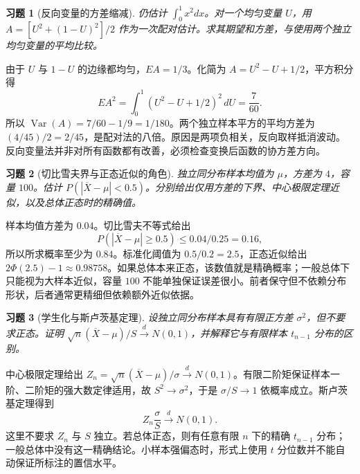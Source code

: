 \documentclass[UTF8,12pt,a4paper,fontset=fandol]{ctexart}
\newtheorem{exercise}{习题}[section]
\begin{document}
\begin{exercise}[反向变量的方差缩减]\label{q:B17.18}
仍估计 $\int_0^1x^2dx$。对一个均匀变量 $U$，用 $A=[U^2+(1-U)^2]/2$ 作为一次配对估计。求其期望和方差，与使用两个独立均匀变量的平均比较。\par{}
\end{exercise}

\begin{solve}\label{a:B17.18}由于 $U$ 与 $1-U$ 的边缘都均匀，$EA=1/3$。化简为 $A=U^2-U+1/2$，平方积分得\[EA^2=\int_0^1(U^2-U+1/2)^2\,dU=\frac7{60}.\]所以 $\operatorname{Var}(A)=7/60-1/9=1/180$。两个独立样本平方的平均方差为 $(4/45)/2=2/45$，是配对法的八倍。原因是两项负相关，反向取样抵消波动。反向变量法并非对所有函数都有改善，必须检查变换后函数的协方差方向。\end{solve}

\begin{exercise}[切比雪夫界与正态近似的角色]\label{q:B17.19}
独立同分布样本均值为 $\mu$，方差为 $4$，容量 $100$。估计 $P(|\overline X-\mu|<0.5)$。分别给出仅用方差的下界、中心极限定理近似，以及总体正态时的精确值。\par{}
\end{exercise}

\begin{solve}\label{a:B17.19}样本均值方差为 $0.04$。切比雪夫不等式给出\[P(|\overline X-\mu|\ge0.5)\le0.04/0.25=0.16,\]所以所求概率至少为 $0.84$。标准化阈值为 $0.5/0.2=2.5$，正态近似给出 $2\Phi(2.5)-1\approx0.98758$。如果总体本来正态，该数值就是精确概率；一般总体下只能视为大样本近似，容量 $100$ 不能单独保证误差很小。前者保守但不依赖分布形状，后者通常更精细但依赖额外近似依据。\end{solve}

\begin{exercise}[学生化与斯卢茨基定理]\label{q:B17.20}
设独立同分布样本具有有限正方差 $\sigma^2$，但不要求正态。证明 $\sqrt n(\overline X-\mu)/S\xrightarrow dN(0,1)$，并解释它与有限样本 $t_{n-1}$ 分布的区别。\par{}
\end{exercise}

\begin{solve}\label{a:B17.20}中心极限定理给出 $Z_n=\sqrt n(\overline X-\mu)/\sigma\xrightarrow dN(0,1)$。有限二阶矩保证样本一阶、二阶矩的强大数定律适用，故 $S^2\to\sigma^2$，于是 $\sigma/S\to1$ 依概率成立。斯卢茨基定理得到\[Z_n\frac\sigma S\xrightarrow dN(0,1).\]这里不要求 $Z_n$ 与 $S$ 独立。若总体正态，则有任意有限 $n$ 下的精确 $t_{n-1}$ 分布；一般总体中没有这一精确结论。小样本强偏态时，形式上使用 $t$ 分位数并不能自动保证所标注的置信水平。\end{solve}
\end{document}
